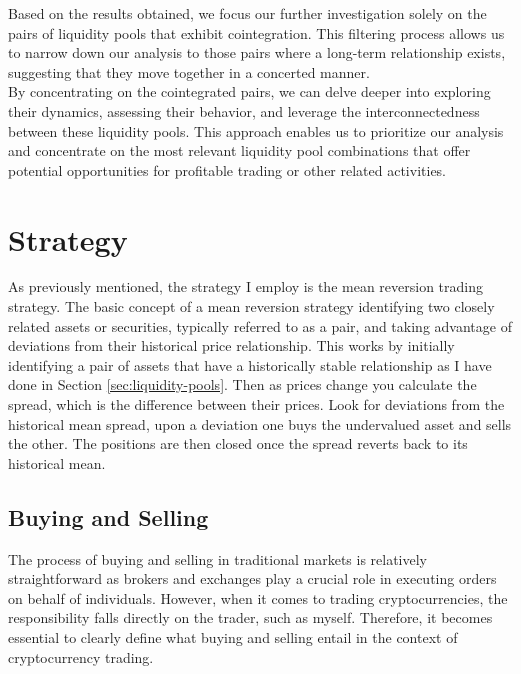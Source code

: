 \noindent Based on the results obtained, we focus our further investigation solely on the pairs of liquidity pools that exhibit cointegration. This filtering process allows us to narrow down our analysis to those pairs where a long-term relationship exists, suggesting that they move together in a concerted manner.
\\[5mm]
By concentrating on the cointegrated pairs, we can delve deeper into exploring their dynamics, assessing their behavior, and leverage the interconnectedness between these liquidity pools. This approach enables us to prioritize our analysis and concentrate on the most relevant liquidity pool combinations that offer potential opportunities for profitable trading or other related activities.
 
\section{Strategy}

As previously mentioned, the strategy I employ is the mean reversion trading strategy. The basic concept of a mean reversion strategy identifying two closely related assets or securities, typically referred to as a pair, and taking advantage of deviations from their historical price relationship. This works by initially identifying a pair of assets that have a historically stable relationship as I have done in Section \ref{sec:liquidity-pools}. Then as prices change you calculate the spread, which is the difference between their prices. Look for deviations from the historical mean spread, upon a deviation one buys the undervalued asset and sells the other. The positions are then closed once the spread reverts back to its historical mean.

\subsection{Buying and Selling}
The process of buying and selling in traditional markets is relatively straightforward as brokers and exchanges play a crucial role in executing orders on behalf of individuals. However, when it comes to trading cryptocurrencies, the responsibility falls directly on the trader, such as myself. Therefore, it becomes essential to clearly define what buying and selling entail in the context of cryptocurrency trading.

